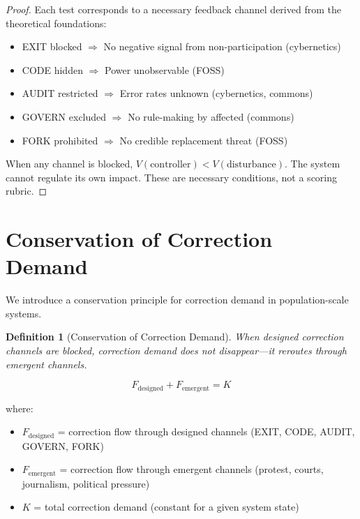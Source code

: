 \documentclass[11pt,a4paper]{article}
\newtheorem{definition}{Definition}
\begin{document}
\begin{proof}
Each test corresponds to a necessary feedback channel derived from the theoretical foundations:
\begin{itemize}
    \item EXIT blocked $\Rightarrow$ No negative signal from non-participation (cybernetics)
    \item CODE hidden $\Rightarrow$ Power unobservable (FOSS)
    \item AUDIT restricted $\Rightarrow$ Error rates unknown (cybernetics, commons)
    \item GOVERN excluded $\Rightarrow$ No rule-making by affected (commons)
    \item FORK prohibited $\Rightarrow$ No credible replacement threat (FOSS)
\end{itemize}
When any channel is blocked, $V(\text{controller}) < V(\text{disturbance})$. The system cannot regulate its own impact. These are necessary conditions, not a scoring rubric.
\end{proof}

\section{Conservation of Correction Demand}

We introduce a conservation principle for correction demand in population-scale systems.

\begin{definition}[Conservation of Correction Demand]
When designed correction channels are blocked, correction demand does not disappear---it reroutes through emergent channels.
\end{definition}

\begin{equation}
F_{\text{designed}} + F_{\text{emergent}} = K
\end{equation}

where:
\begin{itemize}
    \item $F_{\text{designed}}$ = correction flow through designed channels (EXIT, CODE, AUDIT, GOVERN, FORK)
    \item $F_{\text{emergent}}$ = correction flow through emergent channels (protest, courts, journalism, political pressure)
    \item $K$ = total correction demand (constant for a given system state)
\end{itemize}
\end{document}
